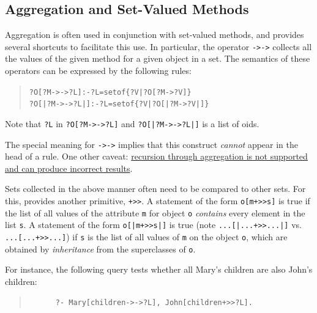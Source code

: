 \documentclass[11pt]{article}
\newcommand{\ERGO}{\mbox{\smaller{\ensuremath{\cal{E}}\smaller{{\sc{RGO}}}}}\xspace}
\newcommand{\FLSYSTEM}{\ERGO}
\begin{document}
\subsection {Aggregation and Set-Valued Methods}

\index{{\tt ->->}}
Aggregation is often used in conjunction with set-valued methods, and
\FLSYSTEM provides several shortcuts to facilitate this use.
In particular, the operator {\tt ->->} 
collects all the values of the given
method for a given object in a set. The semantics of these operators can be
expressed by the following rules:

\begin{quote}
\begin{alltt}
?O[?M->->?L] :- ?L=setof\{?V|?O[?M->?V]\} \vspace{2mm}
?O[|?M->->?L|] :- ?L=setof\{?V|?O[|?M->?V|]\}
\end{alltt}
\end{quote}

\noindent
Note that \texttt{?L}  in {\tt ?O[?M->->?L]}  and {\tt ?O[|?M->->?L|]} is a list of oids.

The special meaning for {\tt ->->} implies that this
construct \emph{cannot} appear in the head of a rule.
One other caveat: \underline{recursion through aggregation is not supported and can
produce incorrect results}.



\index{\tt +>{}>}
Sets collected in the above manner often  need to be compared to other
sets. For this, \FLSYSTEM provides another primitive, {\tt +>{}>}.
A statement of the form {\tt o[m+>{}>s]} is true if the list of all values of the
attribute {\tt m} for object {\tt o} \emph{contains} every
element in the list {\tt s}.  
A statement of the form \texttt{o[|m+>{}>s|]}  is true (note 
\texttt{...[|...+>{}>...|]}   vs. \texttt{...[...+>{}>...]})
if \texttt{s} is the
list of all values of \texttt{m} on the object \texttt{o}, which are
obtained by \emph{inheritance} from the superclasses of \texttt{o}.   

For instance, the following query tests whether all Mary's children are
also John's children:
\begin{quote}
\begin{verbatim}
      ?- Mary[children->->?L], John[children+>>?L].
\end{verbatim}
\end{quote}
\end{document}
